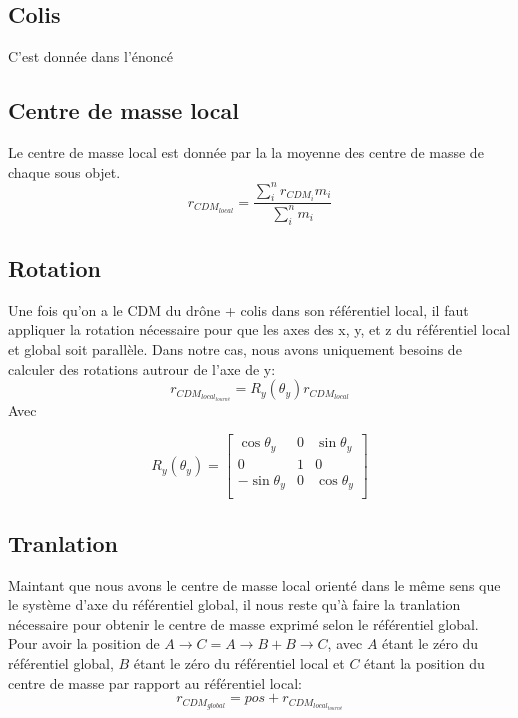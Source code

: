 \documentclass[12pt]{article}
\begin{document}
\subsection{Colis}
C'est donnée dans l'énoncé
\subsection{Centre de masse local}
Le centre de masse local est donnée par la la moyenne des centre de masse de chaque sous objet.
$$r_{CDM_{local}} = \frac{\displaystyle\sum_i^n r_{CDM_{i}}m_i}{\displaystyle\sum_i^n m_i} $$

\subsection{Rotation}
Une fois qu'on a le CDM du drône + colis dans son référentiel local, il faut appliquer la rotation nécessaire pour que les axes des x, y, et z du référentiel local et global soit parallèle. Dans notre cas, nous avons uniquement besoins de calculer des rotations autrour de l'axe de y:
$$r_{CDM_{local_{tourné}}} = R_y(\theta_y)r_{CDM_{local}} $$
Avec 

\begin{equation}
R_y(\theta_y) = 
    \begin{bmatrix}
        \cos\theta_y  & 0   & \sin\theta_y \\
        0             & 1   & 0 \\
        -\sin\theta_y & 0   & \cos\theta_y \\
    \end{bmatrix}
\end{equation}

\subsection{Tranlation}
Maintant que nous avons le centre de masse local orienté dans le même sens que le système d'axe du référentiel global, il nous reste qu'à faire la tranlation nécessaire pour obtenir le centre de masse exprimé selon le référentiel global.
Pour avoir la position de $A\rightarrow C = A\rightarrow B + B\rightarrow C$, avec $A$ étant le zéro du référentiel global, $B$ étant le zéro du référentiel local et $C$ étant la position du centre de masse par rapport au référentiel local:
$$r_{CDM_{global}} = pos + r_{CDM_{local_{tourné}}}$$
\end{document}
